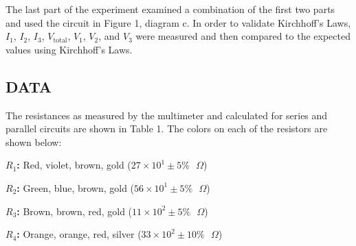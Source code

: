 \documentclass [12pt, letterpaper, twoside] {article}
\begin{document}
The last part of the experiment examined a combination of the first two parts and used the circuit in Figure 1, diagram c. In order to validate Kirchhoff's Laws, \(I_{1}\), \(I_{2}\), \(I_{3}\), \(V_{\text{total}}\), \(V_{1}\), \(V_{2}\), and \(V_{3}\) were measured and then compared to the expected values using Kirchhoff's Laws. 
    
\subsection* {DATA}
The resistances as measured by the multimeter and calculated for series and parallel circuits are shown in Table 1. The colors on each of the resistors are shown below: 

\vspace{0.5cm}
\indent
\textbf{\(R_{1}\):} Red, violet, brown, gold (\(27\times10^{1}\pm5\%\text{ }\Omega\))

\indent
\textbf{\(R_{2}\):} Green, blue, brown, gold (\(56\times10^{1}\pm5\%\text{ }\Omega\))

\indent
\textbf{\(R_{3}\):} Brown, brown, red, gold (\(11\times10^{2}\pm5\%\text{ }\Omega\))

\indent
\textbf{\(R_{4}\):} Orange, orange, red, silver (\(33\times10^{2}\pm10\%\text{ }\Omega\))
\vspace{0.5cm}
\end{document}
